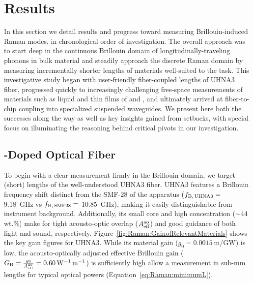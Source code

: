 \section{Results}
\label{sec:Raman:Results}

In this section we detail results and progress toward measuring Brillouin-induced Raman modes, in chronological order of investigation. The overall approach was to start deep in the continuous Brillouin domain of longitudinally-traveling phonons in bulk material and steadily approach the discrete Raman domain by measuring incrementally shorter lengths of materials well-suited to the task. This investigative study began with user-friendly fiber-coupled lengths of \ac{UHNA3} fiber, progressed quickly to increasingly challenging free-space measurements of materials such as liquid  and thin films of  and , and ultimately arrived at fiber-to-chip coupling into specialized suspended waveguides. We present here both the successes along the way as well as key insights gained from setbacks, with special focus on illuminating the reasoning behind critical pivots in our investigation.

\subsection{\texorpdfstring{}{Ge}-Doped Optical Fiber}
\label{subsec:Raman:Target:UHNA3}

To begin with a clear measurement firmly in the Brillouin domain, we target (short) lengths of the well-understood \ac{UHNA3} fiber. \cite{behunin2015long} \ac{UHNA3} features a Brillouin frequency shift distinct from the \ac{SMF-28} of the apparatus (\(f_{\rm B,\,UHNA3} =\) \SI{9.18}{\giga\hertz} vs \(f_{\rm B,\,SMF28} =\) \SI{10.85}{\giga\hertz}), making it easily distinguishable from instrument background. Additionally, its small core and high  concentration (\(\sim\)44 wt.\%) make for tight acousto-optic overlap (\(A_{\rm eff}^{\rm ao}\)) and good guidance of both light and sound, respectively. Figure~\ref{fig:Raman:GainofRelevantMaterials} shows the key gain figures for \ac{UHNA3}. While its material gain (\(g_{0} = \SI{0.0015}{\meter\per\giga\watt}\)) is low, the acousto-optically adjusted effective Brillouin gain (\(G_{\rm B} = \frac{g_{0}}{A_{\rm eff}^{\rm ao}} = \SI{0.60}{\per\watt\per\meter}\)) is sufficiently high allow a measurement in sub-\si{\milli\meter} lengths for typical optical powers (Equation~\ref{eq:Raman:minimumL}).


